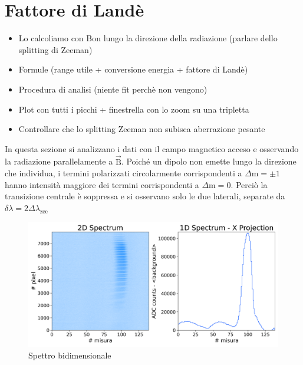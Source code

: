 \documentclass[twocolumn,10pt]{asme2ej}
\begin{document}
\section{Fattore di Landè}

\begin{itemize}
    \item Lo calcoliamo con Bon lungo la direzione della radiazione (parlare dello splitting di Zeeman)
    \item Formule (range utile + conversione energia + fattore di Landè)
    \item Procedura di analisi (niente fit perchè non vengono)
    \item Plot con tutti i picchi + finestrella con lo zoom su una tripletta 
    \item Controllare che lo splitting Zeeman non subisca aberrazione pesante
\end{itemize}
In questa sezione si analizzano i dati con il campo magnetico acceso e osservando la radiazione parallelamente a $\vec{\text{B}}$.
Poiché un dipolo non emette lungo la direzione che individua, i termini polarizzati circolarmente corrispondenti a $\Delta \text{m} = \pm 1$
hanno intensità maggiore dei termini corrispondenti a $\Delta \text{m} = 0$. Perciò la transizione centrale è soppressa e si osservano solo le due laterali,
separate da $\delta\lambda = 2 \Delta\lambda_{\text{zee}}$


\begin{figure}[h]
    \centering
    \includegraphics[width=\linewidth]{../Plots/Bon_2d_spectrum.png}
    \caption{Spettro bidimensionale}
    \label{i:spettro2d_Bon}
\end{figure}
\end{document}
